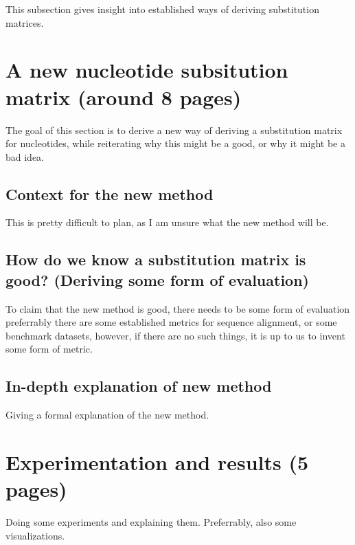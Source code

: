 \documentclass{article}
\begin{document}
This subsection gives insight into established ways of deriving substitution matrices.
%
%
%
\section{A new nucleotide subsitution matrix (around 8 pages)}
The goal of this section is to derive a new way of deriving a substitution matrix for
nucleotides, while reiterating why this might be a good, or why it might be a bad idea.
%
%
%
\subsection{Context for the new method}
This is pretty difficult to plan, as I am unsure what the new method will be.
%
%
%
\subsection{How do we know a substitution matrix is good? (Deriving some form of evaluation)}
To claim that the new method is good, there needs to be some form of evaluation \- preferrably
there are some established metrics for sequence alignment, or some benchmark datasets, however,
if there are no such things, it is up to us to invent some form of metric.
%
%
%
\subsection{In-depth explanation of new method}
Giving a formal explanation of the new method.
%
%
%
\section{Experimentation and results (5 pages)}
Doing some experiments and explaining them. Preferrably, also some visualizations.

\printbibliography
\end{document}

